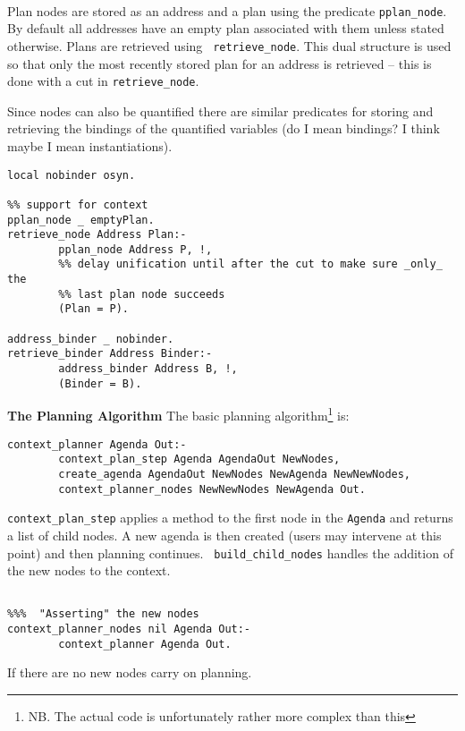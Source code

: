  \\

Plan nodes are stored as an address and a plan using
the predicate {\tt pplan\_node}.  By default all
addresses have an empty plan associated with them
unless stated otherwise.  Plans are retrieved using {\tt
  retrieve\_node}.  This dual structure is used
so that only the most recently stored plan for an address is retrieved
-- this is done with a cut in {\tt retrieve\_node}.

Since nodes can also be quantified there are similar predicates for
storing and retrieving the bindings of the quantified variables  (do I 
mean bindings?  I think maybe I mean instantiations).

\begin{verbatim}
local nobinder osyn.

%% support for context
pplan_node _ emptyPlan.
retrieve_node Address Plan:-
        pplan_node Address P, !,
        %% delay unification until after the cut to make sure _only_ the
        %% last plan node succeeds
        (Plan = P).

address_binder _ nobinder.
retrieve_binder Address Binder:-
        address_binder Address B, !,
        (Binder = B).
\end{verbatim}


{\bf The Planning Algorithm} The basic planning algorithm\footnote{NB.
  The actual code is unfortunately rather more complex than this} is:

\begin{verbatim}
context_planner Agenda Out:-
        context_plan_step Agenda AgendaOut NewNodes,
        create_agenda AgendaOut NewNodes NewAgenda NewNewNodes,
        context_planner_nodes NewNewNodes NewAgenda Out.
\end{verbatim}

{\tt context\_plan\_step} applies a method
to the first node in the {\tt Agenda} and returns a list
of child nodes.  A new agenda is then created (users
may intervene at this point) and then planning continues.  {\tt
  build\_child\_nodes} handles the addition
of the new nodes to the context.

\begin{verbatim}

%%%  "Asserting" the new nodes
context_planner_nodes nil Agenda Out:-
        context_planner Agenda Out. 
\end{verbatim}
If there are no new nodes carry on planning.

